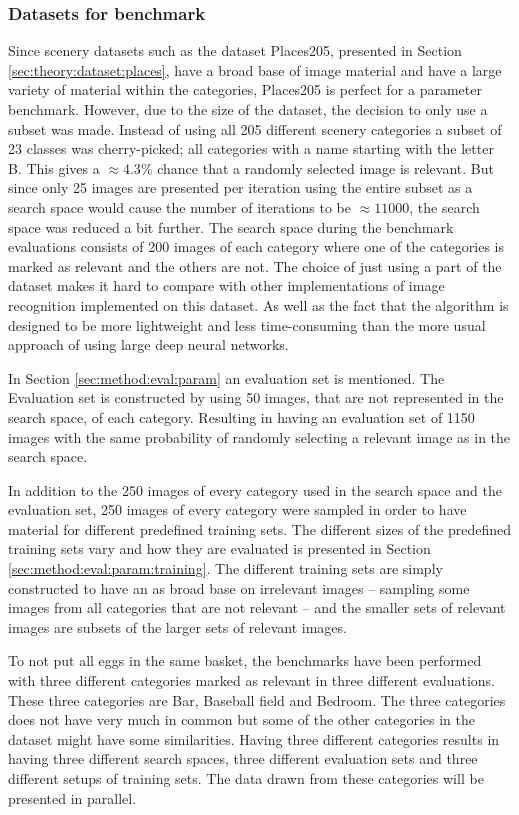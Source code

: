 \subsubsection{Datasets for benchmark}
\label{sec:meth:eval:bench:dataset}

Since scenery datasets such as the dataset Places205, presented in Section \ref{sec:theory:dataset:places}, have a broad base of image material and have a large variety of material within the categories, Places205 is perfect for a parameter benchmark. However, due to the size of the dataset, the decision to only use a subset was made. Instead of using all 205 different scenery categories a subset of 23 classes was cherry-picked; all categories with a name starting with the letter B. This gives a $\approx 4.3\%$ chance that a randomly selected image is relevant. But since only 25 images are presented per iteration using the entire subset as a search space would cause the number of iterations to be $\approx 11000$, the search space was reduced a bit further. The search space during the benchmark evaluations consists of 200 images of each category where one of the categories is marked as relevant and the others are not. 
The choice of just using a part of the dataset makes it hard to compare with other implementations of image recognition implemented on this dataset. As well as the fact that the algorithm is designed to be more lightweight and less time-consuming than the more usual approach of using large deep neural networks.

In Section \ref{sec:method:eval:param} an evaluation set is mentioned. The Evaluation set is constructed by using 50 images, that are not represented in the search space, of each category. Resulting in having an evaluation set of 1150 images with the same probability of randomly selecting a relevant image as in the search space.  

In addition to the 250 images of every category used in the search space and the evaluation set, 250 images of every category were sampled in order to have material for different predefined training sets. The different sizes of the predefined training sets vary and how they are evaluated is presented in Section \ref{sec:method:eval:param:training}. The different training sets are simply constructed to have an as broad base on irrelevant images -- sampling some images from all categories that are not relevant -- and the smaller sets of relevant images are subsets of the larger sets of relevant images.  

To not put all eggs in the same basket, the benchmarks have been performed with three different categories marked as relevant in three different evaluations. These three categories are Bar, Baseball field and Bedroom. The three categories does not have very much in common but some of the other categories in the dataset might have some similarities. Having three different categories results in having three different search spaces, three different evaluation sets and three different setups of training sets. The data drawn from these categories will be presented in parallel. 

